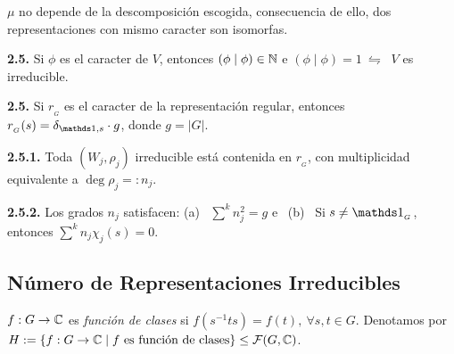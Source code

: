 \begin{corollary}
    \(\mu\) no depende de la descomposición escogida, consecuencia de ello, dos representaciones con mismo caracter son isomorfas.
\end{corollary}

\hypertarget{thm25}{}
\begin{theorem}
    \textbf{2.5.} Si \(\phi\) es el caracter de \(V\), entonces \((\phi\mid \phi) \in \mathbb{N}\) e \((\phi \mid \phi) =1 \ \leftrightharpoons \ \) \(V\) es irreducible. 
\end{theorem}




\begin{proposition}
    \textbf{2.5.} Si \(r_{_G}\) es el caracter de la representación regular, entonces \(r_{_G}(s) = \delta_{\id, s} \cdot g \), donde \(g = |G|\).  
\end{proposition}

\begin{corollary}
    \textbf{2.5.1.} Toda \((W_j,\rho_j)\) irreducible está contenida en \(r_{_G}\), con multiplicidad equivalente a \(\deg\rho_j =: n_j\).  
\end{corollary}

\begin{corollary}
    \textbf{2.5.2.} Los grados \(n_j\) satisfacen: (a) \ \(\sum^k n_j^2 = g\) e \ (b) \ Si \(s\neq \id_{_G}\), entonces \(\sum^k n_j \chi_j(s) = 0\).   
\end{corollary}

\subsection*{Número de Representaciones Irreducibles}

\begin{definition}
    \(f: G \to \mathbb{C}\) es \emph{función de clases} si \(f(s^{-1}ts) = f(t), \ \forall s,t \in G\). Denotamos por \(H:= \{f: G \to \mathbb{C} \mid f\text{ es función de clases}\}\leq \mathcal{F}(G, \mathbb{C})\). 
\end{definition}

